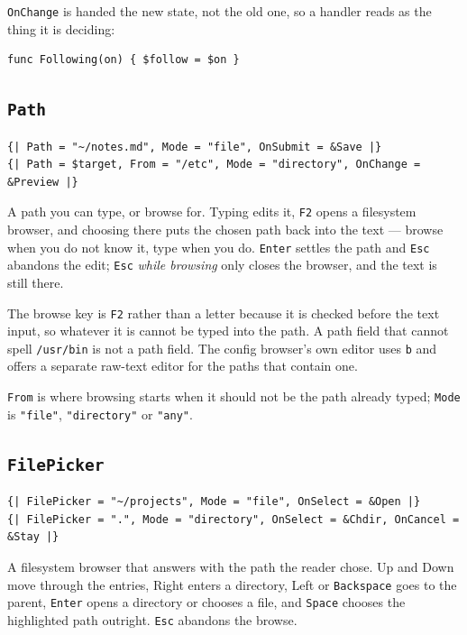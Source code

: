\documentclass[11pt,a4paper,twoside,openany]{book}
\newcommand{\code}[1]{\texttt{\small #1}}
\begin{document}
\code{OnChange} is handed the new state, not the old one, so a handler reads as the
thing it is deciding:

\begin{lstlisting}
func Following(on) { $follow = $on }
\end{lstlisting}

\subsection{\texttt{Path}}

\begin{lstlisting}
{| Path = "~/notes.md", Mode = "file", OnSubmit = &Save |}
{| Path = $target, From = "/etc", Mode = "directory", OnChange = &Preview |}
\end{lstlisting}

A path you can type, or browse for. Typing edits it, \code{F2} opens a filesystem
browser, and choosing there puts the chosen path back into the text --- browse when
you do not know it, type when you do. \code{Enter} settles the path and \code{Esc}
abandons the edit; \code{Esc} \emph{while browsing} only closes the browser, and the
text is still there.

The browse key is \code{F2} rather than a letter because it is checked before the
text input, so whatever it is cannot be typed into the path. A path field that
cannot spell \code{/usr/bin} is not a path field. The config browser's own editor
uses \code{b} and offers a separate raw-text editor for the paths that contain one.

\code{From} is where browsing starts when it should not be the path already typed;
\code{Mode} is \code{"file"}, \code{"directory"} or \code{"any"}.

\subsection{\texttt{FilePicker}}

\begin{lstlisting}
{| FilePicker = "~/projects", Mode = "file", OnSelect = &Open |}
{| FilePicker = ".", Mode = "directory", OnSelect = &Chdir, OnCancel = &Stay |}
\end{lstlisting}

A filesystem browser that answers with the path the reader chose. Up and Down move
through the entries, Right enters a directory, Left or \code{Backspace} goes to the
parent, \code{Enter} opens a directory or chooses a file, and \code{Space} chooses
the highlighted path outright. \code{Esc} abandons the browse.
\end{document}
